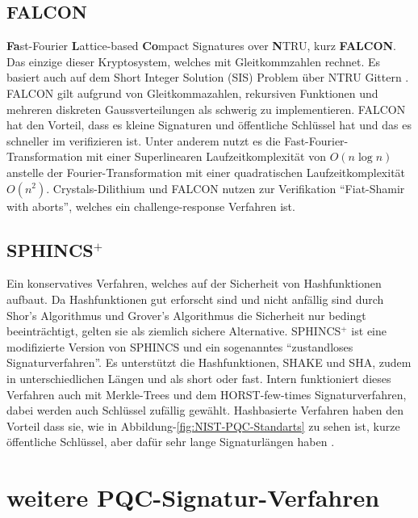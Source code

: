 \subsection{FALCON}
\textbf{Fa}st-Fourier \textbf{L}attice-based \textbf{Co}mpact Signatures over \textbf{N}TRU, kurz \textbf{FALCON}.
Das einzige dieser Kryptosystem, welches mit Gleitkommzahlen rechnet.
Es basiert auch auf dem Short Integer Solution (SIS) Problem über NTRU Gittern \cite{Falcon}.
FALCON gilt aufgrund von Gleitkommazahlen, rekursiven Funktionen und mehreren diskreten Gaussverteilungen als schwerig zu implementieren.
FALCON hat den Vorteil, dass es kleine Signaturen und öffentliche Schlüssel hat und das es schneller im verifizieren ist.
Unter anderem nutzt es die Fast-Fourier-Transformation mit einer Superlinearen Laufzeitkomplexität von $O(n \log n)$ anstelle der Fourier-Transformation mit einer quadratischen Laufzeitkomplexität $O(n^2)$.\cite{nguyenFastFalconSignature2023,soniFALCON2021}
Crystals-Dilithium und FALCON nutzen zur Verifikation \enquote{Fiat-Shamir with aborts}, welches ein challenge-response Verfahren ist\cite{LatticeSignaturesFiatShamir}.

\subsection{SPHINCS$^+$}
Ein konservatives Verfahren, welches auf der Sicherheit von Hashfunktionen aufbaut.
Da Hashfunktionen gut erforscht sind und nicht anfällig sind durch Shor's Algorithmus und Grover's Algorithmus die Sicherheit nur bedingt beeinträchtigt, gelten sie als ziemlich sichere Alternative.
SPHINCS$^+$ ist eine modifizierte Version von SPHINCS und ein sogenanntes \enquote{zustandloses Signaturverfahren}.
Es unterstützt die Hashfunktionen, SHAKE und SHA, zudem in unterschiedlichen Längen und als short oder fast.
Intern funktioniert dieses Verfahren auch mit Merkle-Trees und dem HORST-few-times Signaturverfahren,
dabei werden auch Schlüssel zufällig gewählt.
Hashbasierte Verfahren haben den Vorteil dass sie, wie in Abbildung-\ref{fig:NIST-PQC-Standarts} zu sehen ist, kurze öffentliche Schlüssel, aber dafür sehr lange Signaturlängen haben \cite{soniHardwareArchitecturesPostQuantum2021,aumassonSeriousCryptographyPractical2018,bernsteinSPHINCSSignatureFramework2019,fussKryptographie2025}.

\section{weitere PQC-Signatur-Verfahren}
